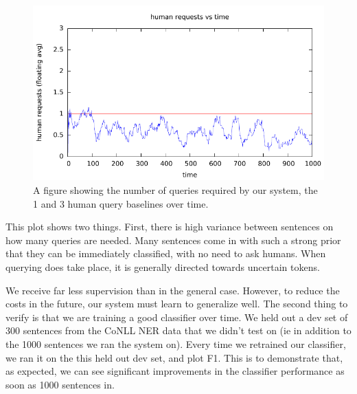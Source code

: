 \begin{figure}[t]
  \begin{centering}
  \includegraphics[width=1.0\textwidth]{figures/ner_2_class/cost_plot/cost_vs_time.pdf}
  \end{centering}
  \caption{A figure showing the number of queries required by our system, the 1 and 3 human query baselines over time.}
\label{fig:ner-cost}
\end{figure}

This plot shows two things. First, there is high variance between sentences on how many queries are needed.
Many sentences come in with such a strong prior that they can be immediately classified, with no need to ask humans.
When querying does take place, it is generally directed towards uncertain tokens.



We receive far less supervision than in the general case.
However, to reduce the costs in the future, our system must learn to generalize well.
The second thing to verify is that we are training a good classifier over time. We held out a dev set of 300 sentences from
the CoNLL NER data that we didn't test on (ie in addition to the 1000 sentences we ran the system on). Every time we retrained
our classifier, we ran it on the this held out dev set, and plot F1. This is to demonstrate that, as expected, we can see
significant improvements in the classifier performance as soon as 1000 sentences in.

